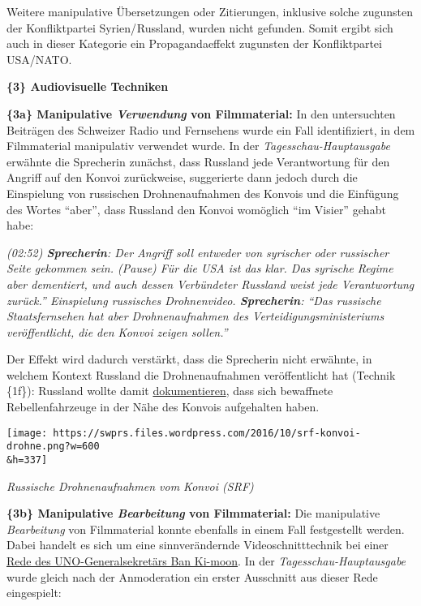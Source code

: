 Weitere manipulative Übersetzungen oder Zitierungen, inklusive solche
zugunsten der Konfliktpartei Syrien/ Russland, wurden nicht gefunden.
Somit ergibt sich auch in dieser Kategorie ein Propagandaeffekt
zugunsten der Konfliktpartei USA/NATO.

\textbf{\{3\} Audiovisuelle Techniken}

\textbf{\{3a\} Manipulative \emph{Verwendung} von Filmmaterial:} In den
untersuchten Beiträgen des Schweizer Radio und Fernsehens wurde ein Fall
identifiziert, in dem Filmmaterial manipulativ verwendet wurde. In der
\emph{Tagesschau-Hauptausgabe} erwähnte die Sprecherin zunächst, dass
Russland jede Verantwortung für den Angriff auf den Konvoi zurückweise,
suggerierte dann jedoch durch die Einspielung von russischen
Drohnenaufnahmen des Konvois und die Einfügung des Wortes ``aber'', dass
Russland den Konvoi womöglich ``im Visier'' gehabt habe:

\emph{(02:52) \textbf{Sprecherin}: Der Angriff soll entweder von
syrischer oder russischer Seite gekommen sein. (Pause) Für die USA ist
das klar. Das syrische Regime aber dementiert, und auch dessen
Verbündeter Russland weist jede Verantwortung zurück.'' Einspielung
russisches Drohnenvideo. \textbf{Sprecherin}: ``Das russische
Staatsfernsehen hat aber Drohnenaufnahmen des Verteidigungs­ministeriums
veröffentlicht, die den Konvoi zeigen sollen.''}

Der Effekt wird dadurch verstärkt, dass die Sprecherin nicht erwähnte,
in welchem Kontext Russland die Drohnenaufnahmen veröffentlicht hat
(Technik \{1f\}): Russland wollte damit
\href{https://sputniknews.com/middleeast/20160920/1045521488/aleppo-un-convoy.html}{dokumentieren},
dass sich bewaffnete Rebellenfahrzeuge in der Nähe des Konvois
aufgehalten haben.

\texttt{[image: https://swprs.files.wordpress.com/2016/10/srf-konvoi-drohne.png?w=600\\\&h=337]}

\emph{Russische Drohnenaufnahmen vom Konvoi (SRF)}

\textbf{\{3b\} Manipulative \emph{Bearbeitung} von Filmmaterial:} Die
manipulative \emph{Bearbeitung} von Filmmaterial konnte ebenfalls in
einem Fall festgestellt werden. Dabei handelt es sich um eine
sinnverändernde Videoschnitttechnik bei einer
\href{https://gadebate.un.org/en/71/secretary-general-united-nations}{Rede
des UNO-Generalsekretärs Ban Ki-moon}. In der
\emph{Tagesschau-Hauptausgabe} wurde gleich nach der Anmoderation ein
erster Ausschnitt aus dieser Rede eingespielt:

